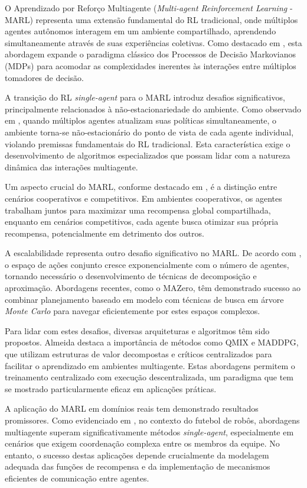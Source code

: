 O Aprendizado por Reforço Multiagente (\textit{Multi-agent Reinforcement Learning} - MARL) representa uma extensão fundamental do RL tradicional, onde múltiplos agentes autônomos interagem em um ambiente compartilhado, aprendendo simultaneamente através de suas experiências coletivas. Como destacado em \cite{bruno_brandao}, esta abordagem expande o paradigma clássico dos Processos de Decisão Markovianos (MDPs) para acomodar as complexidades inerentes às interações entre múltiplos tomadores de decisão.

A transição do RL \textit{single-agent} para o MARL introduz desafios significativos, principalmente relacionados à não-estacionariedade do ambiente. Como observado em \cite{seac_multiagent}, quando múltiplos agentes atualizam suas políticas simultaneamente, o ambiente torna-se não-estacionário do ponto de vista de cada agente individual, violando premissas fundamentais do RL tradicional. Esta característica exige o desenvolvimento de algoritmos especializados que possam lidar com a natureza dinâmica das interações multiagente.

Um aspecto crucial do MARL, conforme destacado em \cite{review_cooperative_multi_agent}, é a distinção entre cenários cooperativos e competitivos. Em ambientes cooperativos, os agentes trabalham juntos para maximizar uma recompensa global compartilhada, enquanto em cenários competitivos, cada agente busca otimizar sua própria recompensa, potencialmente em detrimento dos outros.

A escalabilidade representa outro desafio significativo no MARL. De acordo com \cite{efficient_multi_agent}, o espaço de ações conjunto cresce exponencialmente com o número de agentes, tornando necessário o desenvolvimento de técnicas de decomposição e aproximação. Abordagens recentes, como o MAZero, têm demonstrado sucesso ao combinar planejamento baseado em modelo com técnicas de busca em árvore \textit{Monte Carlo} para navegar eficientemente por estes espaços complexos.

Para lidar com estes desafios, diversas arquiteturas e algoritmos têm sido propostos. Almeida \cite{agentes_inteligentes_puc} destaca a importância de métodos como QMIX e MADDPG, que utilizam estruturas de valor decompostas e críticos centralizados para facilitar o aprendizado em ambientes multiagente. Estas abordagens permitem o treinamento centralizado com execução descentralizada, um paradigma que tem se mostrado particularmente eficaz em aplicações práticas.

A aplicação do MARL em domínios reais tem demonstrado resultados promissores. Como evidenciado em \cite{martins_vss}, no contexto do futebol de robôs, abordagens multiagente superam significativamente métodos \textit{single-agent}, especialmente em cenários que exigem coordenação complexa entre os membros da equipe. No entanto, o sucesso destas aplicações depende crucialmente da modelagem adequada das funções de recompensa e da implementação de mecanismos eficientes de comunicação entre agentes.

